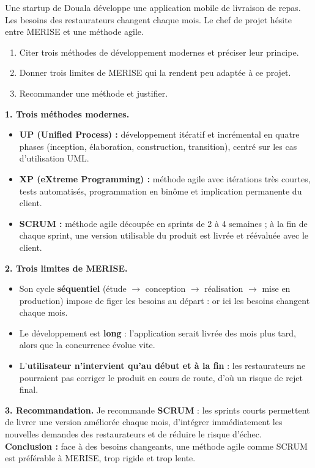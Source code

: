 \documentclass[11pt]{article}
\begin{document}
\begin{exoresolu}
Une startup de Douala développe une application mobile de livraison de repas. Les besoins des restaurateurs changent chaque mois. Le chef de projet hésite entre MERISE et une méthode agile.
\begin{enumerate}
  \item Citer trois méthodes de développement modernes et préciser leur principe.
  \item Donner trois limites de MERISE qui la rendent peu adaptée à ce projet.
  \item Recommander une méthode et justifier.
\end{enumerate}
\tcblower
\textbf{1. Trois méthodes modernes.}
\begin{itemize}
  \item \textbf{UP (Unified Process) :} développement itératif et incrémental en quatre phases (inception, élaboration, construction, transition), centré sur les cas d'utilisation UML.
  \item \textbf{XP (eXtreme Programming) :} méthode agile avec itérations très courtes, tests automatisés, programmation en binôme et implication permanente du client.
  \item \textbf{SCRUM :} méthode agile découpée en sprints de 2 à 4 semaines ; à la fin de chaque sprint, une version utilisable du produit est livrée et réévaluée avec le client.
\end{itemize}
\textbf{2. Trois limites de MERISE.}
\begin{itemize}
  \item Son cycle \textbf{séquentiel} (étude $\rightarrow$ conception $\rightarrow$ réalisation $\rightarrow$ mise en production) impose de figer les besoins au départ : or ici les besoins changent chaque mois.
  \item Le développement est \textbf{long} : l'application serait livrée des mois plus tard, alors que la concurrence évolue vite.
  \item L'\textbf{utilisateur n'intervient qu'au début et à la fin} : les restaurateurs ne pourraient pas corriger le produit en cours de route, d'où un risque de rejet final.
\end{itemize}
\textbf{3. Recommandation.} Je recommande \textbf{SCRUM} : les sprints courts permettent de livrer une version améliorée chaque mois, d'intégrer immédiatement les nouvelles demandes des restaurateurs et de réduire le risque d'échec.\\
\textbf{Conclusion :} face à des besoins changeants, une méthode agile comme SCRUM est préférable à MERISE, trop rigide et trop lente.
\end{exoresolu}
\end{document}
